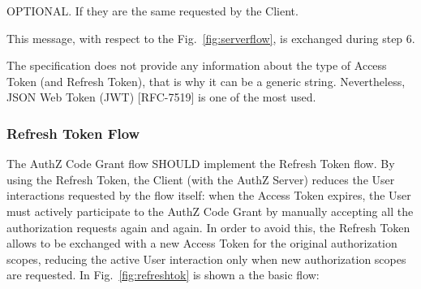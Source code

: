 \documentclass[a4paper,12pt]{article}
\def\myfig#1{Fig.~#1\xspace}
\def\rfc#1{RFC-#1\xspace}
\begin{document}
\hspace{0.5cm}OPTIONAL. If they are the same requested by the Client.

\vspace{0.5cm}

This message, with respect to the \myfig{\ref{fig:serverflow}}, is exchanged during step 6.

The specification does not provide any information about the type of Access Token (and Refresh Token), that is why it can be a generic string. Nevertheless, JSON Web Token (JWT) [\rfc{7519}] \cite{RFC7519} is one of the most used. 

\subsubsection{Refresh Token Flow}
\label{accref}
The AuthZ Code Grant flow SHOULD implement the Refresh Token flow. By using the Refresh Token, the Client (with the AuthZ Server) reduces the User interactions requested by the flow itself:  when the Access Token expires, the User must actively participate to the AuthZ Code Grant by manually accepting all the authorization requests again and again. In order to avoid this, the Refresh Token allows to be exchanged with a new Access Token for the original authorization scopes, reducing the active User interaction only when new authorization scopes are requested.  In \myfig{\ref{fig:refreshtok}} is shown a the basic flow:
\end{document}
